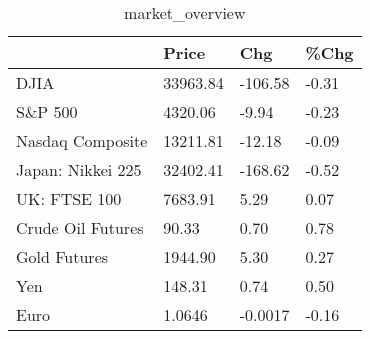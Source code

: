 \documentclass{article}%
\begin{document}
%


\begin{table}[htbp]%
\caption{market\_overview}%
\centering%
\begin{adjustbox}{width=1\textwidth}%
\begin{tabular}{llll}
\toprule
                  &    Price &     Chg &  \%Chg \\
\midrule
             DJIA & 33963.84 & -106.58 & -0.31 \\
          S\&P 500 &  4320.06 &   -9.94 & -0.23 \\
 Nasdaq Composite & 13211.81 &  -12.18 & -0.09 \\
Japan: Nikkei 225 & 32402.41 & -168.62 & -0.52 \\
     UK: FTSE 100 &  7683.91 &    5.29 &  0.07 \\
Crude Oil Futures &    90.33 &    0.70 &  0.78 \\
     Gold Futures &  1944.90 &    5.30 &  0.27 \\
              Yen &   148.31 &    0.74 &  0.50 \\
             Euro &   1.0646 & -0.0017 & -0.16 \\
\bottomrule
\end{tabular}
%
\end{adjustbox}%
\end{table}

%
\end{document}
